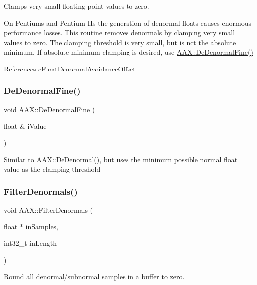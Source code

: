 Clamps very small floating point values to zero. 

On Pentiums and Pentium I\+Is the generation of denormal floats causes enormous performance losses. This routine removes denormals by clamping very small values to zero. The clamping threshold is very small, but is not the absolute minimum. If absolute minimum clamping is desired, use \mbox{\hyperlink{a00852_ac52b6214a1de32e59b90ddbc1878e515}{A\+A\+X\+::\+De\+Denormal\+Fine()}} 

References c\+Float\+Denormal\+Avoidance\+Offset.

\mbox{\label{a00852_ac52b6214a1de32e59b90ddbc1878e515}} 
\subsubsection{\texorpdfstring{DeDenormalFine()}{DeDenormalFine()}}
{\footnotesize\ttfamily void A\+A\+X\+::\+De\+Denormal\+Fine (\begin{DoxyParamCaption}\item[{float \&}]{i\+Value }\end{DoxyParamCaption})\hspace{0.3cm}{\ttfamily [inline]}}

Similar to \mbox{\hyperlink{a00852_aaf103dc75b68b6c4f6792dd26f9b4fd0}{A\+A\+X\+::\+De\+Denormal()}}, but uses the minimum possible normal float value as the clamping threshold \mbox{\label{a00852_a73dd9a17abecc28625c4d34279e4534f}} 
\subsubsection{\texorpdfstring{FilterDenormals()}{FilterDenormals()}}
{\footnotesize\ttfamily void A\+A\+X\+::\+Filter\+Denormals (\begin{DoxyParamCaption}\item[{float $\ast$}]{in\+Samples,  }\item[{int32\+\_\+t}]{in\+Length }\end{DoxyParamCaption})\hspace{0.3cm}{\ttfamily [inline]}}



Round all denormal/subnormal samples in a buffer to zero. 


